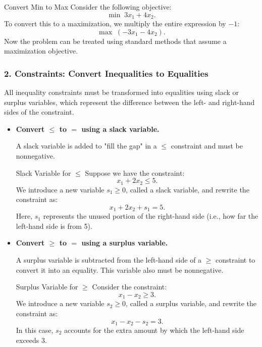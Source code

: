 \begin{example}{Convert Min to Max}
Consider the following objective:
\[
\min \; 3x_1 + 4x_2.
\]
To convert this to a maximization, we multiply the entire expression by \( -1 \):
\[
\max \; (-3x_1 - 4x_2).
\]
Now the problem can be treated using standard methods that assume a maximization objective.
\end{example}
\newpage
\subsubsection*{2. Constraints: Convert Inequalities to Equalities}

All inequality constraints must be transformed into equalities using slack or surplus variables, which represent the difference between the left- and right-hand sides of the constraint.

\begin{itemize}
    \item[(a)] \textbf{Convert \( \leq \) to \( = \) using a slack variable.}

    A slack variable is added to "fill the gap" in a \( \leq \) constraint and must be nonnegative.

    \begin{example}{Slack Variable for \(\leq\)}
    Suppose we have the constraint:
    \[
    x_1 + 2x_2 \leq 5.
    \]
    We introduce a new variable \( s_1 \geq 0 \), called a slack variable, and rewrite the constraint as:
    \[
    x_1 + 2x_2 + s_1 = 5.
    \]
    Here, \( s_1 \) represents the unused portion of the right-hand side (i.e., how far the left-hand side is from 5).
    \end{example}

    \item[(b)] \textbf{Convert \( \geq \) to \( = \) using a surplus variable.}

    A surplus variable is subtracted from the left-hand side of a \( \geq \) constraint to convert it into an equality. This variable also must be nonnegative.

    \begin{example}{Surplus Variable for \(\geq\)}
    Consider the constraint:
    \[
    x_1 - x_2 \geq 3.
    \]
    We introduce a new variable \( s_2 \geq 0 \), called a surplus variable, and rewrite the constraint as:
    \[
    x_1 - x_2 - s_2 = 3.
    \]
    In this case, \( s_2 \) accounts for the extra amount by which the left-hand side exceeds 3.
    \end{example}
\end{itemize}


